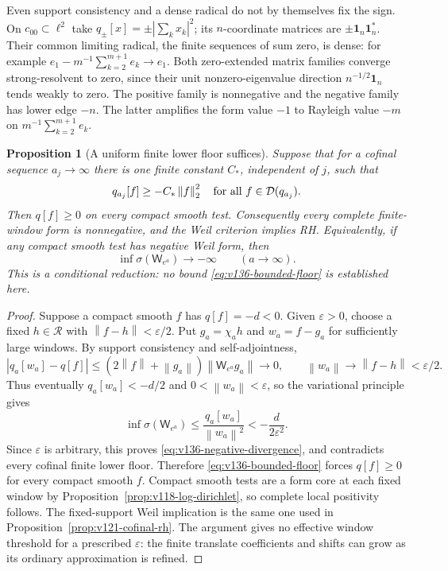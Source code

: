 \documentclass[11pt]{article}
\newtheorem{proposition}[theorem]{Proposition}
\theoremstyle{remark}
\newcommand{\norm}[1]{\left\lVert #1\right\rVert}
\begin{document}
Even support consistency and a dense radical do not by themselves
fix the sign. On $c_{00}\subset\ell^2$ take
$q_\pm[x]=\pm|\sum_kx_k|^2$; its $n$-coordinate matrices are
$\pm\mathbf1_n\mathbf1_n^*$. Their common limiting radical,
the finite sequences of sum zero, is dense: for example
$e_1-m^{-1}\sum_{k=2}^{m+1}e_k\to e_1$.
Both zero-extended matrix families converge strong-resolvent to zero,
since their unit nonzero-eigenvalue direction
$n^{-1/2}\mathbf1_n$ tends weakly to zero. The positive family is
nonnegative and the negative family has lower edge $-n$.
The latter amplifies the form value $-1$ to Rayleigh value $-m$
on $m^{-1}\sum_{k=2}^{m+1}e_k$.

\begin{proposition}[A uniform finite lower floor suffices]
\label{prop:v136-bounded-floor}
Suppose that for a cofinal sequence $a_j\to\infty$ there is one
finite constant $C_*$, independent of $j$, such that
\begin{equation}\label{eq:v136-bounded-floor}
 q_{a_j}[f]\ge-C_*\norm f_2^2
 \quad\hbox{for all }f\in\mathcal D(q_{a_j}).
\end{equation}
Then $q[f]\ge0$ on every compact smooth test. Consequently every
complete finite-window form is nonnegative, and the Weil criterion
implies RH. Equivalently, if any compact smooth test has negative
Weil form, then
\begin{equation}\label{eq:v136-negative-divergence}
 \inf\sigma(\mathsf W_{e^a})\longrightarrow-\infty
 \qquad(a\longrightarrow\infty).
\end{equation}
This is a conditional reduction: no bound \eqref{eq:v136-bounded-floor}
is established here.
\end{proposition}
\begin{proof}
Suppose a compact smooth $f$ has $q[f]=-d<0$. Given $\varepsilon>0$,
choose a fixed $h\in\mathcal R$ with $\norm{f-h}<\varepsilon/2$.
Put $g_a=\chi_a h$ and $w_a=f-g_a$ for sufficiently large windows.
By support consistency and self-adjointness,
\[
 |q_a[w_a]-q[f]|
 \le (2\norm f+\norm{g_a})\norm{\mathsf W_{e^a}g_a}
 \longrightarrow0,\qquad
 \norm{w_a}\longrightarrow\norm{f-h}<\varepsilon/2.
\]
Thus eventually $q_a[w_a]<-d/2$ and $0<\norm{w_a}<\varepsilon$,
so the variational principle gives
\begin{equation}\label{eq:v136-negative-amplification}
 \inf\sigma(\mathsf W_{e^a})
 \le\frac{q_a[w_a]}{\norm{w_a}^2}
 <-\frac{d}{2\varepsilon^2}.
\end{equation}
Since $\varepsilon$ is arbitrary, this proves
\eqref{eq:v136-negative-divergence}, and contradicts every cofinal
finite lower floor. Therefore \eqref{eq:v136-bounded-floor} forces
$q[f]\ge0$ for every compact smooth $f$.
Compact smooth tests are a form core at each fixed window by
Proposition~\ref{prop:v118-log-dirichlet}, so complete local
positivity follows. The fixed-support Weil implication is the same
one used in Proposition~\ref{prop:v121-cofinal-rh}.
The argument gives no effective window threshold for a prescribed
$\varepsilon$: the finite translate coefficients and shifts can grow
as its ordinary approximation is refined.
\end{proof}
\end{document}
